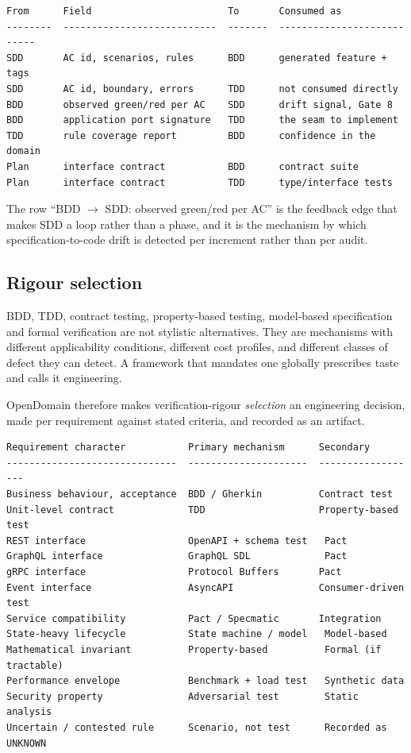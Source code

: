 \documentclass[11pt,a4paper]{article}
\begin{document}
\begin{Verbatim}[fontsize=\footnotesize,breaklines=true,breakanywhere=true,breakautoindent=false,samepage=false]
From      Field                        To       Consumed as
--------  ---------------------------  -------  ---------------------------
SDD       AC id, scenarios, rules      BDD      generated feature + tags
SDD       AC id, boundary, errors      TDD      not consumed directly
BDD       observed green/red per AC    SDD      drift signal, Gate 8
BDD       application port signature   TDD      the seam to implement
TDD       rule coverage report         BDD      confidence in the domain
Plan      interface contract           BDD      contract suite
Plan      interface contract           TDD      type/interface tests
\end{Verbatim}

The row ``BDD $\rightarrow$ SDD: observed green/red per AC'' is the feedback edge that makes SDD a loop rather than a phase, and it is the mechanism by which specification-to-code drift is detected per increment rather than per audit.

\subsection{Rigour selection}

BDD, TDD, contract testing, property-based testing, model-based specification and formal verification are not stylistic alternatives. They are mechanisms with different applicability conditions, different cost profiles, and different classes of defect they can detect. A framework that mandates one globally prescribes taste and calls it engineering.

OpenDomain therefore makes verification-rigour \emph{selection} an engineering decision, made per requirement against stated criteria, and recorded as an artifact.

\begin{Verbatim}[fontsize=\footnotesize,breaklines=true,breakanywhere=true,breakautoindent=false,samepage=false]
Requirement character           Primary mechanism      Secondary
------------------------------  ---------------------  ------------------
Business behaviour, acceptance  BDD / Gherkin          Contract test
Unit-level contract             TDD                    Property-based test
REST interface                  OpenAPI + schema test   Pact
GraphQL interface               GraphQL SDL             Pact
gRPC interface                  Protocol Buffers       Pact
Event interface                 AsyncAPI               Consumer-driven test
Service compatibility           Pact / Specmatic       Integration
State-heavy lifecycle           State machine / model   Model-based
Mathematical invariant          Property-based          Formal (if tractable)
Performance envelope            Benchmark + load test   Synthetic data
Security property               Adversarial test        Static analysis
Uncertain / contested rule      Scenario, not test      Recorded as UNKNOWN
\end{Verbatim}
\end{document}

